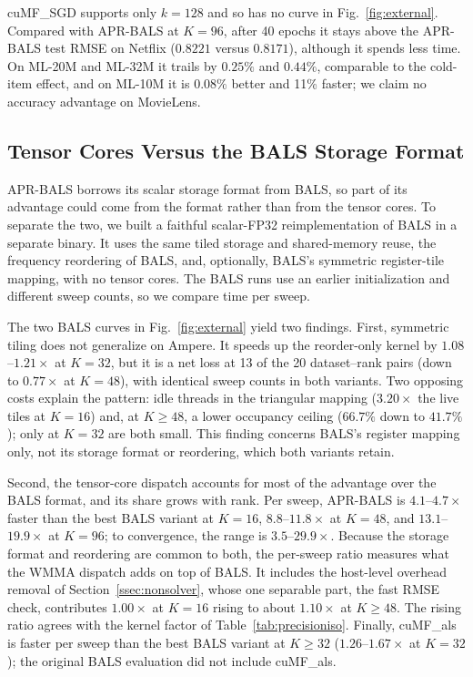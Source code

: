 cuMF\_SGD supports only $k=128$ and so has no curve in Fig.~\ref{fig:external}. Compared with APR-BALS at $K=96$, after 40 epochs it stays above the APR-BALS test RMSE on Netflix ($0.8221$ versus $0.8171$), although it spends less time. On ML-20M and ML-32M it trails by $0.25\%$ and $0.44\%$, comparable to the cold-item effect, and on ML-10M it is $0.08\%$ better and 11\% faster; we claim no accuracy advantage on MovieLens.

\subsection{Tensor Cores Versus the BALS Storage Format}
\label{ssec:balsequiv}

APR-BALS borrows its scalar storage format from BALS, so part of its advantage could come from the format rather than from the tensor cores. To separate the two, we built a faithful scalar-FP32 reimplementation of BALS in a separate binary. It uses the same tiled storage and shared-memory reuse, the frequency reordering of BALS, and, optionally, BALS's symmetric register-tile mapping, with no tensor cores. The BALS runs use an earlier initialization and different sweep counts, so we compare time per sweep.

The two BALS curves in Fig.~\ref{fig:external} yield two findings. First, symmetric tiling does not generalize on Ampere. It speeds up the reorder-only kernel by $1.08$--$1.21\times$ at $K=32$, but it is a net loss at 13 of the 20 dataset--rank pairs (down to $0.77\times$ at $K=48$), with identical sweep counts in both variants. Two opposing costs explain the pattern: idle threads in the triangular mapping ($3.20\times$ the live tiles at $K=16$) and, at $K \ge 48$, a lower occupancy ceiling ($66.7\%$ down to $41.7\%$); only at $K=32$ are both small. This finding concerns BALS's register mapping only, not its storage format or reordering, which both variants retain.

Second, the tensor-core dispatch accounts for most of the advantage over the BALS format, and its share grows with rank. Per sweep, APR-BALS is $4.1$--$4.7\times$ faster than the best BALS variant at $K=16$, $8.8$--$11.8\times$ at $K=48$, and $13.1$--$19.9\times$ at $K=96$; to convergence, the range is $3.5$--$29.9\times$. Because the storage format and reordering are common to both, the per-sweep ratio measures what the WMMA dispatch adds on top of BALS. It includes the host-level overhead removal of Section~\ref{ssec:nonsolver}, whose one separable part, the fast RMSE check, contributes $1.00\times$ at $K=16$ rising to about $1.10\times$ at $K \ge 48$. The rising ratio agrees with the kernel factor of Table~\ref{tab:precisioniso}. Finally, cuMF\_als is faster per sweep than the best BALS variant at $K \ge 32$ ($1.26$--$1.67\times$ at $K=32$); the original BALS evaluation did not include cuMF\_als.

